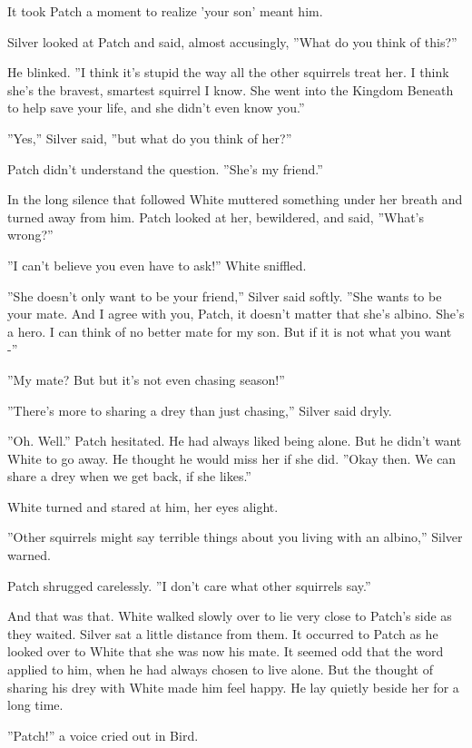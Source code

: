 \documentclass[12pt]{book}
\begin{document}
It took Patch a moment to realize 'your son' meant him.

Silver looked at Patch and said, almost accusingly, ''What do you think of this?''

He blinked. ''I think it's stupid the way all the other squirrels treat her. I think she's the bravest, smartest squirrel I know. She went into the Kingdom Beneath to help save your life, and she didn't even know you.''

''Yes,'' Silver said, ''but what do you think of her?''

Patch didn't understand the question. ''She's my friend.''

In the long silence that followed White muttered something under her breath and turned away from him. Patch looked at her, bewildered, and said, ''What's wrong?''

''I can't believe you even have to ask!'' White sniffled.

''She doesn't only want to be your friend,'' Silver said softly. ''She wants to be your mate. And I agree with you, Patch, it doesn't matter that she's albino. She's a hero. I can think of no better mate for my son. But if it is not what you want -''

''My mate? But %
but it's not even chasing season!''

''There's more to sharing a drey than just chasing,'' Silver said dryly.

''Oh. Well.'' Patch hesitated. He had always liked being alone. But he didn't want White to go away. He thought he would miss her if she did. ''Okay then. We can share a drey when we get back, if she likes.''

White turned and stared at him, her eyes alight.

''Other squirrels might say terrible things about you living with an albino,'' Silver warned.

Patch shrugged carelessly. ''I don't care what other squirrels say.''

And that was that. White walked slowly over to lie very close to Patch's side as they waited. Silver sat a little distance from them. It occurred to Patch as he looked over to White that she was now his mate. It seemed odd that the word applied to him, when he had always chosen to live alone. But the thought of sharing his drey with White made him feel happy. He lay quietly beside her for a long time.

''Patch!'' a voice cried out in Bird.
\end{document}
